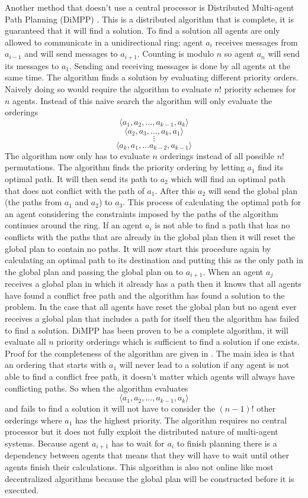 Another method that doesn't use a central processor is Distributed Multi-agent
Path Planning (DiMPP) \cite{chouhan2017}. This is a distributed algorithm that
is complete, it is guaranteed that it will find a solution. To find a
solution all agents are only allowed to communicate in a unidirectional ring:
agent $a_i$ receives messages from $a_{i-1}$ and will send messages to
$a_{i+1}$. Counting is modulo $n$ so agent $a_n$ will send its messages to
$a_1$. Sending and receiving messages is done by all agents at the same time.
The algorithm finds a solution by evaluating different priority orders. Naively
doing so would require the algorithm to evaluate $n!$ priority schemes for $n$
agents. Instead of this naive search the algorithm will only evaluate the
orderings
\[ \langle a_1, a_2, \ldots, a_{k-1}, a_k \rangle \]
\[ \langle a_2, a_3, \ldots, a_k, a_1 \rangle \]
\[ \vdots \]
\[ \langle a_k, a_1, \ldots a_{k-2}, a_{k-1} \rangle \]
The algorithm now only has to evaluate $n$ orderings instead of
all possible $n!$ permutations. The algorithm finds the priority ordering
by letting $a_1$ find its optimal path. It will then send its path to $a_2$
which will find an optimal path that does not conflict with the path of $a_1$.
After this $a_2$ will send the global plan (the paths from $a_1$ and $a_2$) to
$a_3$. This process of calculating the optimal path for an agent considering
the constraints imposed by the paths of the algorithm continues around the
ring. If an agent $a_i$ is not able to find a path that has no conflicts with
the paths that are already in the global plan then it will reset the global
plan to contain no
paths. It will now start this procedure again by calculating an optimal path to
its destination and putting this as the only path in the global plan and
passing the global plan on to $a_{i+1}$. When an agent $a_j$ receives a global
plan in which it already has a path then it knows that all agents have found a
conflict free path and the algorithm has found a solution to the problem. In
the case that all agents have reset the global plan but no agent ever receives
a global plan that includes a path for itself then the algorithm has failed to
find a solution. DiMPP has been proven to be a complete algorithm, it will
evaluate all $n$ priority orderings which is sufficient to find a solution if
one exists. Proof for the completeness of the algorithm are given in
\cite[subsection 5.1]{chouhan2017}. The main idea is that an ordering that
starts with $a_1$ will never lead to a solution if any agent is not able to
find a conflict free path, it doesn't matter which agents will always have
conflicting paths. So when the algorithm evaluates
\[ \langle a_1, a_2, \ldots, a_{k-1}, a_k \rangle \]
and fails to find a solution it will not have to
consider the $(n-1)!$ other orderings where $a_1$ has the highest priority. The
algorithm requires no central processor but it does not fully exploit the
distributed nature of multi-agent systems. Because agent $a_{i+1}$ has
to wait for
$a_i$ to finish planning there is a dependency between agents that means that
they will have to wait until other agents finish their calculations. This
algorithm is also not online like most decentralized algorithms because the
global plan will be constructed before it is executed.

